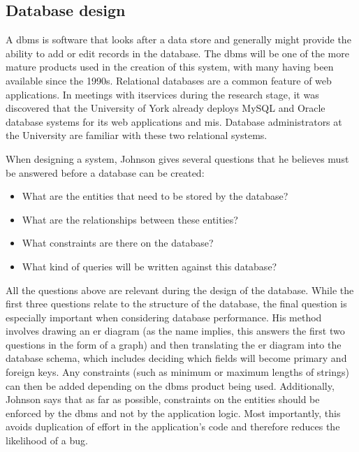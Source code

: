 
\subsection{Database design}
\label{sec:researchdatabase}

A \gls{dbms} is software that looks after a data store and generally might
provide the ability to add or edit records in the database. The \gls{dbms}
will be one of the more mature products used in the creation of this system,
with many having been available since the 1990s. Relational databases are a
common feature of web applications. In meetings with \gls{itservices} during
the research stage, it was discovered that the University of York already
deploys MySQL and Oracle database systems for its web applications and
\gls{mis}. Database administrators at the University are familiar with these
two relational systems.

When designing a system, Johnson \cite{DatabaseModelsLanguagesDesign} gives
several questions that he believes must be answered before a database can be
created:

\begin{itemize}
  \item What are the entities that need to be stored by the database?
  \item What are the relationships between these entities?
  \item What constraints are there on the database?
  \item What kind of queries will be written against this database?
\end{itemize}

All the questions above are relevant during the design of the database. While
the first three questions relate to the structure of the database, the final
question is especially important when considering database performance. His
method involves drawing an \gls{er} diagram (as the name implies, this answers
the first two questions in the form of a graph) and then translating the
\gls{er} diagram into the database schema, which includes deciding which
fields will become primary and foreign keys. Any constraints (such as minimum
or maximum lengths of strings) can then be added depending on the \gls{dbms}
product being used. Additionally, Johnson says that as far as possible,
constraints on the entities should be enforced by the \gls{dbms} and not by
the application logic. Most importantly, this avoids duplication of effort in
the application's code and therefore reduces the likelihood of a bug.

